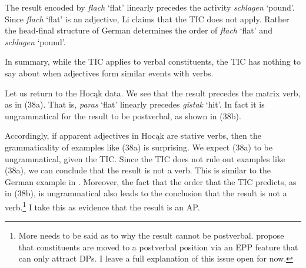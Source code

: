 \documentclass[output=paper]{LSP/langsci}
\begin{document}
The result encoded by \textit{flach} `flat' linearly precedes the activity \textit{schlagen} `pound'. Since \textit{flach} `flat' is an adjective, Li claims that the TIC does not apply. Rather the head-final structure of German determines the order of \textit{flach} `flat' and \textit{schlagen} `pound'. 

In summary, while the TIC applies to verbal constituents, the TIC has nothing to say about when adjectives form similar events with verbs.

Let us return to the Hocąk data. We see that the result precedes the matrix verb, as in (38a). That is, \textit{paras} `flat' linearly precedes \textit{gistak} `hit'. In fact it is ungrammatical for the result to be postverbal, as shown in (38b).

\begin{exe}
\ex
\begin{xlist}



\end{xlist}
\end{exe}

Accordingly, if apparent adjectives in Hocąk are stative verbs, then the grammaticality of examples like (38a) is surprising. We expect (38a) to be ungrammatical, given the TIC. Since the TIC does not rule out examples like (38a), we can conclude that the result is not a verb. This is similar to the German example in . Moreover, the fact that the order that the TIC predicts, as in (38b), is ungrammatical also leads to the conclusion that the result is not a verb.\footnote{More needs to be said as to why the result cannot be postverbal. \citet{JohnsonRosen2014} propose that constituents are moved to a postverbal position via an EPP feature that can only attract DPs. I leave a full explanation of this issue open for now.} I take this as evidence that the result is an AP.
\end{document}
